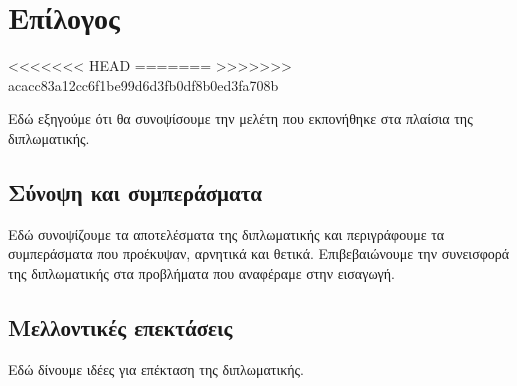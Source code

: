 \chapter{Επίλογος}
<<<<<<< HEAD
\label{chap7}
=======
\label{chap8}
>>>>>>> acacc83a12cc6f1be99d6d3fb0df8b0ed3fa708b

Εδώ εξηγούμε ότι θα συνοψίσουμε την μελέτη που εκπονήθηκε στα πλαίσια της διπλωματικής.

\section{Σύνοψη και συμπεράσματα}

Εδώ συνοψίζουμε τα αποτελέσματα της διπλωματικής και περιγράφουμε τα συμπεράσματα που προέκυψαν, αρνητικά και θετικά. Επιβεβαιώνουμε την συνεισφορά της διπλωματικής στα προβλήματα που αναφέραμε στην εισαγωγή.

\section{Μελλοντικές επεκτάσεις}

Εδώ δίνουμε ιδέες για επέκταση της διπλωματικής.
